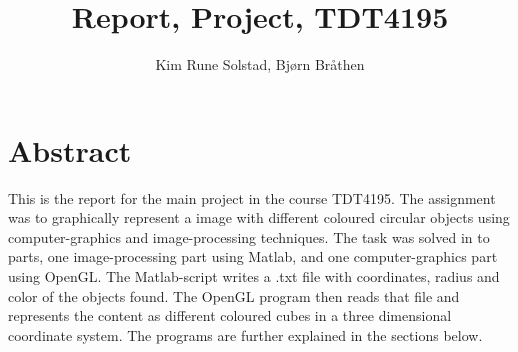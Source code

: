 \documentclass[english, a4paper]{article}
\title{Report, Project, TDT4195}
\author{Kim Rune Solstad, Bjørn Bråthen}
\begin{document}
\maketitle

\section{Abstract}
This is the report for the main project in the course TDT4195. The assignment was to graphically represent a image with different coloured circular objects using computer-graphics and image-processing techniques. The task was solved in to parts, one image-processing part using Matlab, and one computer-graphics part using OpenGL. The Matlab-script writes a .txt file with coordinates, radius and color of the objects found. The OpenGL program then reads that file and represents the content as different coloured cubes in a three dimensional coordinate system. The programs are further explained in the sections below. 





\end{document}
